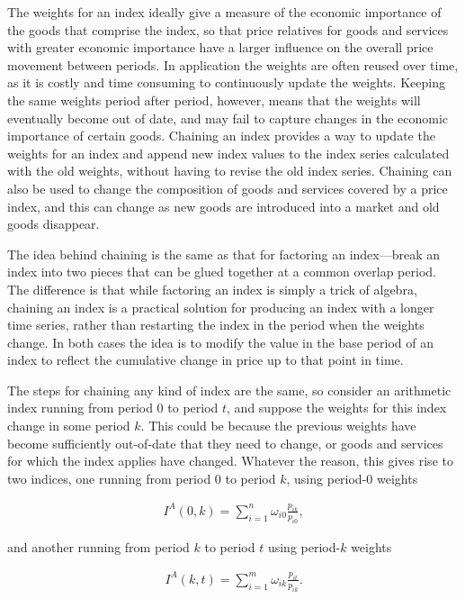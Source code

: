 \documentclass[]{article}
\begin{document}
The weights for an index ideally give a measure of the economic importance of the goods that comprise the index, so that price relatives for goods and services with greater economic importance have a larger influence on the overall price movement between periods. In application the weights are often reused over time, as it is costly and time consuming to continuously update the weights. Keeping the same weights period after period, however, means that the weights will eventually become out of date, and may fail to capture changes in the economic importance of certain goods. Chaining an index provides a way to update the weights for an index and append new index values to the index series calculated with the old weights, without having to revise the old index series. Chaining can also be used to change the composition of goods and services covered by a price index, and this can change as new goods are introduced into a market and old goods disappear.

The idea behind chaining is the same as that for factoring an index---break an index into two pieces that can be glued together at a common overlap period. The difference is that while factoring an index is simply a trick of algebra, chaining an index is a practical solution for producing an index with a longer time series, rather than restarting the index in the period when the weights change. In both cases the idea is to modify the value in the base period of an index to reflect the cumulative change in price up to that point in time.

The steps for chaining any kind of index are the same, so consider an arithmetic index running from period 0 to period \(t\), and suppose the weights for this index change in some period \(k\). This could be because the previous weights have become sufficiently out-of-date that they need to change, or goods and services for which the index applies have changed. Whatever the reason, this gives rise to two indices, one running from period 0 to period \(k\), using period-0 weights

\begin{align*}
I^{A}(0, k) = \sum_{i = 1}^{n} \omega_{i0} \frac{p_{ik}}{p_{i0}},
\end{align*}

and another running from period \(k\) to period \(t\) using period-\(k\) weights

\begin{align*}
I^{A}(k, t) = \sum_{i = 1}^{m} \omega_{ik} \frac{p_{it}}{p_{ik}}.
\end{align*}
\end{document}
